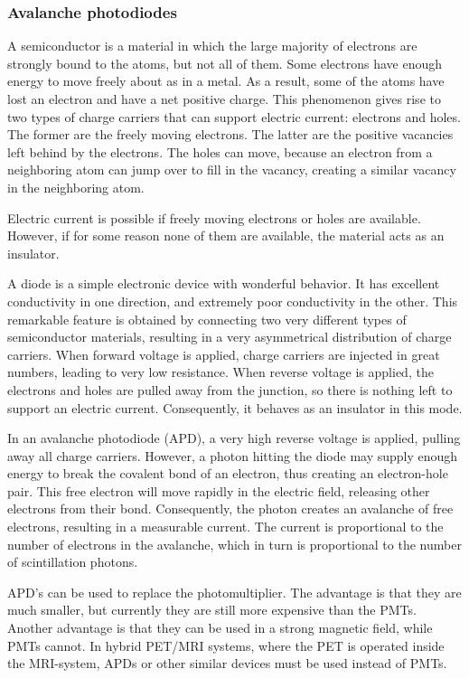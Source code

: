 \documentclass[11pt,oneside]{book}
\begin{document}
\subsubsection{Avalanche photodiodes}
A semiconductor is a material in which the large majority of electrons are
strongly bound to the atoms, but not all of them. Some electrons have enough
energy to move freely about as in a metal. As a result, some of the atoms
have lost an electron and have a net positive charge. This phenomenon gives
rise to two types of charge carriers that can support electric current:
electrons and holes. The former are the freely moving electrons. The latter
are the positive vacancies left behind by the electrons. The holes can move,
because an electron from a neighboring atom can jump over to fill in the
vacancy, creating a similar vacancy in the neighboring atom.

Electric current is possible if freely moving electrons or holes are
available. However, if for some reason none of them are available, the
material acts as an insulator.

A diode is a simple electronic device with wonderful behavior. It has
excellent conductivity in one direction, and extremely poor conductivity in
the other.  This remarkable feature is obtained by connecting two very
different types of semiconductor materials, resulting in a very asymmetrical
distribution of charge carriers. When forward voltage is applied, charge
carriers are injected in great numbers, leading to very low resistance. When
reverse voltage is applied, the electrons and holes are pulled away from the
junction, so there is nothing left to support an electric
current. Consequently, it behaves as an insulator in this mode.

In an avalanche photodiode (APD), a very high reverse voltage is applied,
pulling away all charge carriers. However, a photon hitting the diode may
supply enough energy to break the covalent bond of an electron, thus
creating an electron-hole pair. This free electron will move rapidly in the
electric field, releasing other electrons from their bond. Consequently, the
photon creates an avalanche of free electrons, resulting in a measurable
current. The current is proportional to the number of electrons in the
avalanche, which in turn is proportional to the number of
scintillation photons.

APD's can be used to replace the photomultiplier. The advantage is
that they are much smaller, but currently they are still more
expensive than the PMTs. Another advantage is that they can be used in
a strong magnetic field, while PMTs cannot. In hybrid PET/MRI systems,
where the PET is operated inside the MRI-system, APDs or other similar
devices must be used instead of PMTs.
\end{document}
